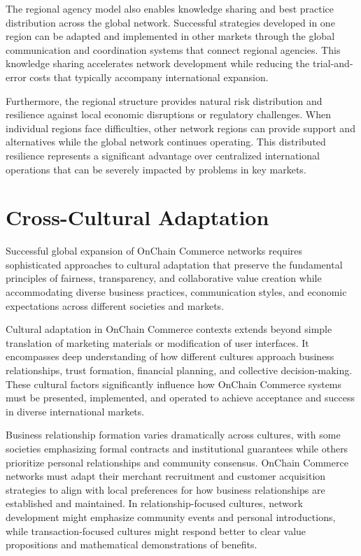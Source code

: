 \documentclass[
  Letterpaper,
]{scrbook}
\begin{document}
The regional agency model also enables knowledge sharing and best
practice distribution across the global network. Successful strategies
developed in one region can be adapted and implemented in other markets
through the global communication and coordination systems that connect
regional agencies. This knowledge sharing accelerates network
development while reducing the trial-and-error costs that typically
accompany international expansion.

Furthermore, the regional structure provides natural risk distribution
and resilience against local economic disruptions or regulatory
challenges. When individual regions face difficulties, other network
regions can provide support and alternatives while the global network
continues operating. This distributed resilience represents a
significant advantage over centralized international operations that can
be severely impacted by problems in key markets.

\section{Cross-Cultural Adaptation}\label{cross-cultural-adaptation}

Successful global expansion of OnChain Commerce networks requires
sophisticated approaches to cultural adaptation that preserve the
fundamental principles of fairness, transparency, and collaborative
value creation while accommodating diverse business practices,
communication styles, and economic expectations across different
societies and markets.

Cultural adaptation in OnChain Commerce contexts extends beyond simple
translation of marketing materials or modification of user interfaces.
It encompasses deep understanding of how different cultures approach
business relationships, trust formation, financial planning, and
collective decision-making. These cultural factors significantly
influence how OnChain Commerce systems must be presented, implemented,
and operated to achieve acceptance and success in diverse international
markets.

Business relationship formation varies dramatically across cultures,
with some societies emphasizing formal contracts and institutional
guarantees while others prioritize personal relationships and community
consensus. OnChain Commerce networks must adapt their merchant
recruitment and customer acquisition strategies to align with local
preferences for how business relationships are established and
maintained. In relationship-focused cultures, network development might
emphasize community events and personal introductions, while
transaction-focused cultures might respond better to clear value
propositions and mathematical demonstrations of benefits.
\end{document}
